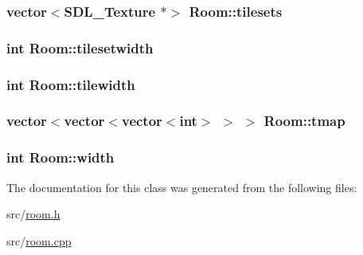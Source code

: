 \hypertarget{class_room_a9ad1d805bf9c69b138a66b3f64adf88d}{
\subsubsection[{tilesets}]{\setlength{\rightskip}{0pt plus 5cm}vector$<$S\-D\-L\-\_\-\-Texture $\ast$$>$ Room\-::tilesets\hspace{0.3cm}{\ttfamily [protected]}}}\label{class_room_a9ad1d805bf9c69b138a66b3f64adf88d}
\hypertarget{class_room_a4664e77f8780c752449b57f2d603be5c}{
\subsubsection[{tilesetwidth}]{\setlength{\rightskip}{0pt plus 5cm}int Room\-::tilesetwidth\hspace{0.3cm}{\ttfamily [protected]}}}\label{class_room_a4664e77f8780c752449b57f2d603be5c}
\hypertarget{class_room_a1ee2ea2d741c7196d7d2fd37ae741042}{
\subsubsection[{tilewidth}]{\setlength{\rightskip}{0pt plus 5cm}int Room\-::tilewidth\hspace{0.3cm}{\ttfamily [protected]}}}\label{class_room_a1ee2ea2d741c7196d7d2fd37ae741042}
\hypertarget{class_room_aba520dbf1dd1907f5cdcbc8b6372ec53}{
\subsubsection[{tmap}]{\setlength{\rightskip}{0pt plus 5cm}vector$<$vector$<$vector$<$int$>$ $>$ $>$ Room\-::tmap\hspace{0.3cm}{\ttfamily [protected]}}}\label{class_room_aba520dbf1dd1907f5cdcbc8b6372ec53}
\hypertarget{class_room_a0c68c6762e7d93eb459ba552dadaf308}{
\subsubsection[{width}]{\setlength{\rightskip}{0pt plus 5cm}int Room\-::width\hspace{0.3cm}{\ttfamily [protected]}}}\label{class_room_a0c68c6762e7d93eb459ba552dadaf308}


The documentation for this class was generated from the following files\-:\begin{DoxyCompactItemize}
\item 
src/\hyperlink{room_8h}{room.\-h}\item 
src/\hyperlink{room_8cpp}{room.\-cpp}\end{DoxyCompactItemize}
